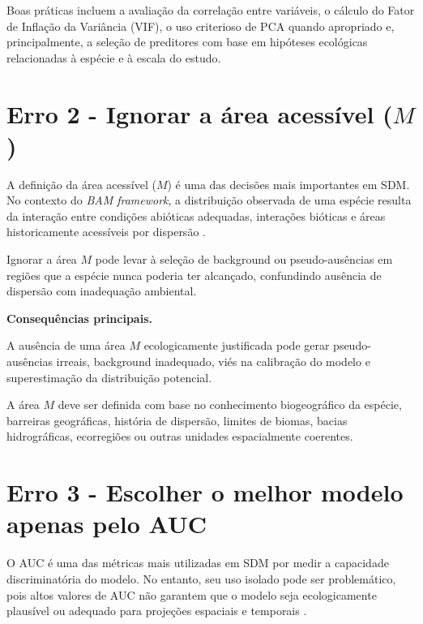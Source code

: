 Boas práticas incluem a avaliação da correlação entre variáveis, o cálculo do
Fator de Inflação da Variância (VIF), o uso criterioso de PCA quando
apropriado e, principalmente, a seleção de preditores com base em hipóteses
ecológicas relacionadas à espécie e à escala do estudo.

\section{Erro 2 - Ignorar a área acessível \texorpdfstring{($M$)}{M}}

A definição da área acessível ($M$) é uma das decisões mais importantes em
SDM. No contexto do \textit{BAM framework}, a distribuição observada de uma
espécie resulta da interação entre condições abióticas adequadas, interações
bióticas e áreas historicamente acessíveis por dispersão
\citep{soberon2005interpretation, soberon2009niches, barve2011crucial}.

Ignorar a área $M$ pode levar à seleção de background ou pseudo-ausências em
regiões que a espécie nunca poderia ter alcançado, confundindo ausência de
dispersão com inadequação ambiental.

\begin{sdmwarningbox}
	\textbf{Consequências principais.}
	
	A ausência de uma área $M$ ecologicamente justificada pode gerar
	pseudo-ausências irreais, background inadequado, viés na calibração do modelo
	e superestimação da distribuição potencial.
\end{sdmwarningbox}

A área $M$ deve ser definida com base no conhecimento biogeográfico da espécie,
barreiras geográficas, história de dispersão, limites de biomas, bacias
hidrográficas, ecorregiões ou outras unidades espacialmente coerentes.

\section{Erro 3 - Escolher o melhor modelo apenas pelo AUC}

O AUC é uma das métricas mais utilizadas em SDM por medir a capacidade
discriminatória do modelo. No entanto, seu uso isolado pode ser problemático,
pois altos valores de AUC não garantem que o modelo seja ecologicamente
plausível ou adequado para projeções espaciais e temporais
\citep{lobo2008auc, allouche2006assessing}.

